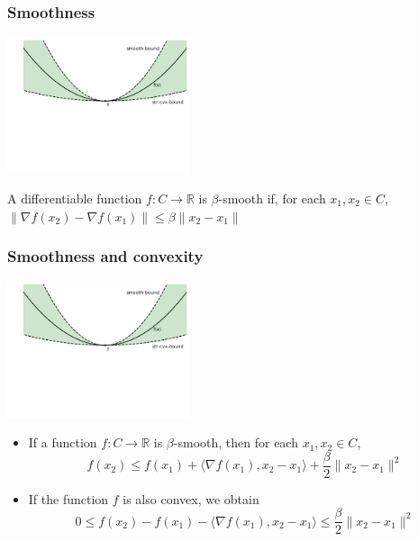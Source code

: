 \documentclass[10pt]{beamer}
\begin{document}
\begin{frame}
  \frametitle{Smoothness}
  \begin{center}
  \includegraphics[height=4cm]{images/smooth.png}
  \end{center}
  \vspace*{-2cm}
  \begin{definition}
	A differentiable function $f:C\rightarrow\mathbb{R}$ is {\color{red} $\beta$-smooth} if, for each $x_1,x_2\in C$, $\lVert \nabla f(x_2) - \nabla f(x_1) \rVert \leq \beta \lVert x_2 - x_1 \rVert$
  \end{definition}
\end{frame}

\begin{frame}
  \frametitle{Smoothness and convexity}
  \begin{center}
  \includegraphics[height=4cm]{images/smooth.png}
  \end{center}
  \vspace*{-2cm}
  \begin{itemize}
	\item If a function $f:C\rightarrow\mathbb{R}$ is $\beta$-smooth, then for each $x_1,x_2\in C$,
	\[f(x_2) \leq f(x_1) + \langle \nabla f(x_1), x_2 - x_1 \rangle + \frac \beta 2 \lVert x_2 - x_1 \rVert^2\]
	\item If the function $f$ is also convex, we obtain
	\[0 \leq f(x_2) - f(x_1) - \langle \nabla f(x_1), x_2 - x_1 \rangle \leq \frac \beta 2 \lVert x_2 - x_1 \rVert^2\]
  \end{itemize}
  \vspace*{-.8cm}
  \begin{center}
  \end{center}
\end{frame}
\end{document}
